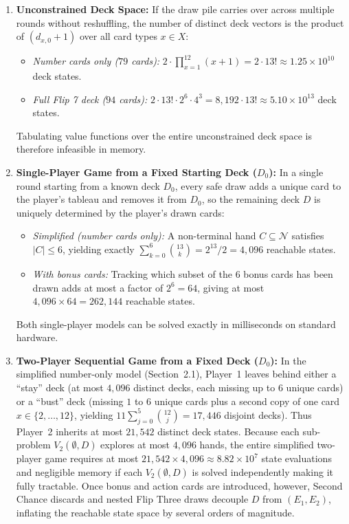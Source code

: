 \documentclass{article}
\theoremstyle{plain}
\theoremstyle{definition}
\theoremstyle{remark}
\begin{document}
\begin{enumerate}
    \item \textbf{Unconstrained Deck Space:} If the draw pile carries over across multiple rounds without reshuffling, the number of distinct deck vectors is the product of $(d_{x,0} + 1)$ over all card types $x \in X$:
    \begin{itemize}
        \item \textit{Number cards only ($79$ cards):} $2 \cdot \prod_{x=1}^{12}(x + 1) = 2 \cdot 13! \approx 1.25 \times 10^{10}$ deck states.
        \item \textit{Full Flip 7 deck ($94$ cards):} $2 \cdot 13! \cdot 2^{6} \cdot 4^{3} = 8{,}192 \cdot 13! \approx 5.10 \times 10^{13}$ deck states.
    \end{itemize}
    Tabulating value functions over the entire unconstrained deck space is therefore infeasible in memory.

    \item \textbf{Single-Player Game from a Fixed Starting Deck ($D_0$):} In a single round starting from a known deck $D_0$, every safe draw adds a unique card to the player's tableau and removes it from $D_0$, so the remaining deck $D$ is uniquely determined by the player's drawn cards:
    \begin{itemize}
        \item \textit{Simplified (number cards only):} A non-terminal hand $C \subseteq \mathcal{N}$ satisfies $|C| \le 6$, yielding exactly $\sum_{k=0}^{6} \binom{13}{k} = 2^{13}/2 = 4{,}096$ reachable states.
        \item \textit{With bonus cards:} Tracking which subset of the $6$ bonus cards has been drawn adds at most a factor of $2^6 = 64$, giving at most $4{,}096 \times 64 = 262{,}144$ reachable states.
    \end{itemize}
    Both single-player models can be solved exactly in milliseconds on standard hardware.

    \item \textbf{Two-Player Sequential Game from a Fixed Deck ($D_0$):} In the simplified number-only model (Section~2.1), Player~1 leaves behind either a ``stay'' deck (at most $4{,}096$ distinct decks, each missing up to $6$ unique cards) or a ``bust'' deck (missing $1$ to $6$ unique cards plus a second copy of one card $x \in \{2, \dots, 12\}$, yielding $11 \sum_{j=0}^{5} \binom{12}{j} = 17{,}446$ disjoint decks). Thus Player~2 inherits at most $21{,}542$ distinct deck states. Because each sub-problem $V_2(\emptyset, D)$ explores at most $4{,}096$ hands, the entire simplified two-player game requires at most $21{,}542 \times 4{,}096 \approx 8.82 \times 10^{7}$ state evaluations and negligible memory if each $V_2(\emptyset, D)$ is solved independently making it fully tractable. Once bonus and action cards are introduced, however, Second Chance discards and nested Flip Three draws decouple $D$ from $(E_1, E_2)$, inflating the reachable state space by several orders of magnitude.


\end{enumerate}
\end{document}

